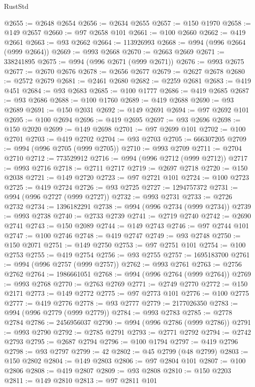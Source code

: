 \begin{lexlean}{RustStd}
\begin{coremodule}
@2655 := @2648 @2654
@2656 := @2634 @2655
@2657 := @150 @1970
@2658 := @149 @2657
@2660 := @97 @2658 @101
@2661 := @100 @2660
@2662 := @419 @2661
@2663 := @93 @2662
@2664 := 113926993
@2668 := @994 (@996 @2664 (@999 @2664))
@2669 := @993 @2668
@2670 := @2663 @2669
@2671 := 338241895
@2675 := @994 (@996 @2671 (@999 @2671))
@2676 := @993 @2675
@2677 := @2670 @2676
@2678 := @2656 @2677
@2679 := @2627 @2678
@2680 := @2572 @2679
@2681 := @2461 @2680
@2682 := @2259 @2681
@2683 := @419 @451
@2684 := @93 @2683
@2685 := @100 @1777
@2686 := @419 @2685
@2687 := @93 @2686
@2688 := @100 @1760
@2689 := @419 @2688
@2690 := @93 @2689
@2691 := @150 @2031
@2692 := @149 @2691
@2694 := @97 @2692 @101
@2695 := @100 @2694
@2696 := @419 @2695
@2697 := @93 @2696
@2698 := @150 @2020
@2699 := @149 @2698
@2701 := @97 @2699 @101
@2702 := @100 @2701
@2703 := @419 @2702
@2704 := @93 @2703
@2705 := 666307205
@2709 := @994 (@996 @2705 (@999 @2705))
@2710 := @993 @2709
@2711 := @2704 @2710
@2712 := 773529912
@2716 := @994 (@996 @2712 (@999 @2712))
@2717 := @993 @2716
@2718 := @2711 @2717
@2719 := @2697 @2718
@2720 := @150 @2038
@2721 := @149 @2720
@2723 := @97 @2721 @101
@2724 := @100 @2723
@2725 := @419 @2724
@2726 := @93 @2725
@2727 := 1294757372
@2731 := @994 (@996 @2727 (@999 @2727))
@2732 := @993 @2731
@2733 := @2726 @2732
@2734 := 1396182291
@2738 := @994 (@996 @2734 (@999 @2734))
@2739 := @993 @2738
@2740 := @2733 @2739
@2741 := @2719 @2740
@2742 := @2690 @2741
@2743 := @150 @2089
@2744 := @149 @2743
@2746 := @97 @2744 @101
@2747 := @100 @2746
@2748 := @419 @2747
@2749 := @93 @2748
@2750 := @150 @2071
@2751 := @149 @2750
@2753 := @97 @2751 @101
@2754 := @100 @2753
@2755 := @419 @2754
@2756 := @93 @2755
@2757 := 1695183700
@2761 := @994 (@996 @2757 (@999 @2757))
@2762 := @993 @2761
@2763 := @2756 @2762
@2764 := 1986661051
@2768 := @994 (@996 @2764 (@999 @2764))
@2769 := @993 @2768
@2770 := @2763 @2769
@2771 := @2749 @2770
@2772 := @150 @2171
@2773 := @149 @2772
@2775 := @97 @2773 @101
@2776 := @100 @2775
@2777 := @419 @2776
@2778 := @93 @2777
@2779 := 2177026350
@2783 := @994 (@996 @2779 (@999 @2779))
@2784 := @993 @2783
@2785 := @2778 @2784
@2786 := 2456956037
@2790 := @994 (@996 @2786 (@999 @2786))
@2791 := @993 @2790
@2792 := @2785 @2791
@2793 := @2771 @2792
@2794 := @2742 @2793
@2795 := @2687 @2794
@2796 := @100 @1794
@2797 := @419 @2796
@2798 := @93 @2797
@2799 := 42
@2802 := @45 @2799 (@48 @2799)
@2803 := @150 @2802
@2804 := @149 @2803
@2806 := @97 @2804 @101
@2807 := @100 @2806
@2808 := @419 @2807
@2809 := @93 @2808
@2810 := @150 @2203
@2811 := @149 @2810
@2813 := @97 @2811 @101

\end{coremodule}
\end{lexlean}
